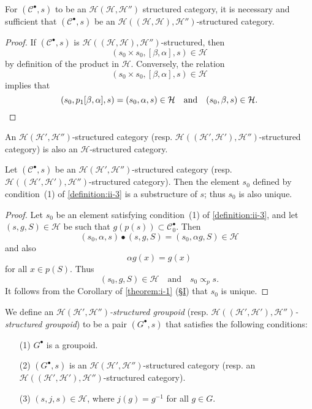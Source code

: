 \documentclass[a4paper,fleqn]{article}
\theoremstyle{plain}
\newenvironment{proposition}[1]
  {\renewcommand\theinnerproposition{#1}\innerproposition}
  {\endinnerproposition}
\theoremstyle{definition}
\newenvironment{definition}[1]
  {\renewcommand\theinnerdefinition{#1}\innerdefinition}
  {\endinnerdefinition}
\newcommand{\textand}{\quad\text{and}\quad}
\newcommand{\CC}{\mathcal{C}}
\newcommand{\HH}{\mathcal{H}}
\newcommand{\subs}{\mathrel{\propto}}
\begin{document}
\begin{proposition}{5}
\label{proposition:ii-5}
  For $(\CC^\bullet,s)$ to be an $\HH(\HH,\HH'')$ structured category, it is necessary and sufficient that $(\CC^\bullet,s)$ be an $\HH((\HH,\HH),\HH'')$-structured category.
\end{proposition}

\begin{proof}
  If $(\CC^\bullet,s)$ is $\HH((\HH,\HH),\HH'')$-structured, then
  \[
    (s_0\times s_0,[\beta,\alpha],s)
    \in\HH
  \]
  by definition of the product in $\HH$.
  Conversely, the relation
  \[
    (s_0\times s_0,[\beta,\alpha],s)
    \in\HH
  \]
  implies that
  \[
    (s_0,p_1[\beta,\alpha],s)
    = (s_0,\alpha,s)\in\HH
    \textand
    (s_0,\beta,s)
    \in\HH.
    \qedhere
  \]
\end{proof}

An $\HH(\HH',\HH'')$-structured category (resp. $\HH((\HH',\HH'),\HH'')$-structured category) is also an $\HH$-structured category.

\begin{proposition}{6}
\label{proposition:ii-6}
  Let $(\CC^\bullet,s)$ be an $\HH(\HH',\HH'')$-structured category (resp. $\HH((\HH',\HH'),\HH'')$-structured category).
  Then the element $s_0$ defined by condition~(1) of \cref{definition:ii-3} is a substructure of $s$; thus $s_0$ is also unique.
\end{proposition}

\begin{proof}
  Let $s_0$ be an element satisfying condition~(1) of \cref{definition:ii-3}, and let $(s,g,S)\in\HH$ be such that $g(p(s))\subset\CC_0^\bullet$.
  Then
  \[
    (s_0,\alpha,s)\bullet(s,g,S)
    = (s_0,\alpha g,S)\in\HH
  \]
  and also
  \[
    \alpha g(x)
    = g(x)
  \]
  for all $x\in p(S)$.
  Thus
  \[
    (s_0,g,S)\in\HH
    \textand
    s_0\subs_p s.
  \]
  It follows from the Corollary of \cref{theorem:i-1} (\hyperref[section:i]{§I}) that $s_0$ is unique.
\end{proof}

\begin{definition}{4}
\label{definition:ii-4}
  We define an \emph{$\HH(\HH',\HH'')$-structured groupoid} (resp. \emph{$\HH((\HH',\HH'),\HH'')$-structured groupoid}) to be a pair $(G^\bullet,s)$ that satisfies the following conditions:
  \begin{enumerate}
    \item[\normalfont(1)]
      $G^\bullet$ is a groupoid.

    \item[\normalfont(2)]
      $(G^\bullet,s)$ is an $\HH(\HH',\HH'')$-structured category (resp. an $\HH((\HH',\HH'),\HH'')$-structured category).

    \item[\normalfont(3)]
      $(s,j,s)\in\HH$, where $j(g)=g^{-1}$ for all $g\in G$.
  \end{enumerate}
\end{definition}
\end{document}
